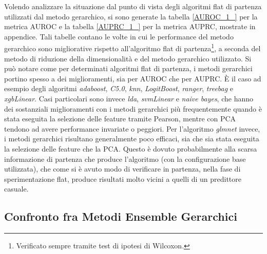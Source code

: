 \documentclass[12pt]{report}
\begin{document}
\newpage
Volendo analizzare la situazione dal punto di vista degli algoritmi flat di partenza utilizzati dal metodo gerarchico, si sono generate la tabella \ref{AUROC_1_} per la metrica AUROC e la tabella \ref{AUPRC_1_} per la metrica AUPRC, mostrate in appendice. Tali tabelle contano le volte in cui le performance del metodo gerarchico sono migliorative rispetto all'algoritmo flat di partenza\footnote{\footnotesize{Verificato sempre tramite test di ipotesi di Wilcoxon.}}, a seconda del metodo di riduzione della dimensionalità e del metodo gerarchico utilizzato. Si può notare come per determinati algoritmi flat di partenza, i metodi gerarchici portino spesso a dei miglioramenti, sia per AUROC che per AUPRC. È il caso ad esempio degli algoritmi \emph{adaboost}, \emph{C5.0}, \emph{knn}, \emph{LogitBoost}, \emph{ranger}, \emph{treebag} e \emph{xgbLinear}. Casi particolari sono invece \emph{lda}, \emph{svmLinear} e \emph{naive bayes}, che hanno dei sostanziali miglioramenti con i metodi gerarchici più frequentemente quando è stata eseguita la selezione delle feature tramite Pearson, mentre con PCA tendono ad avere performance invariate o peggiori. Per l'algoritmo \emph{glmnet} invece, i metodi gerarchici risultano generalmente poco efficaci, sia che sia stata eseguita la selezione delle feature che la PCA. Questo è dovuto probabilmente alla scarsa informazione di partenza che produce l'algoritmo (con la configurazione base utilizzata), che come si è avuto modo di verificare in partenza, nella fase di sperimentazione flat, produce risultati molto vicini a quelli di un predittore casuale.

\subsection{Confronto fra Metodi Ensemble Gerarchici}
\end{document}
